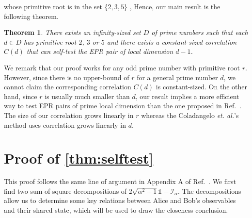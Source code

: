 \documentclass[11pt,letterpaper]{article}
\newcommand{\1}{\mathbb{1}}
\newcommand{\I}{\mathcal{I}}
\newtheorem{theorem}{Theorem}
\theoremstyle{definition}
\begin{document}
whose primitive root is in the set $\{2,3,5\}$ \cite{murty1988},
Hence, our main result is the following theorem.
\begin{theorem}
	There exists an infinity-sized set $D$ of prime numbers such that 
	each $d \in D$ has primitive root $2$, $3$ or $5$ and there exists
	a constant-sized correlation $C(d)$ that can self-test the EPR pair of 
	local dimension $d-1$.
\end{theorem}
We remark that our proof works for any odd prime number with primitive root $r$.
However, since there is no upper-bound of $r$ for a general prime number $d$, we 
cannot claim the corresponding correlation $C(d)$ is constant-sized. On the other
hand, since $r$ is usually much smaller than $d$, our result implies a more efficient
way to test EPR pairs of prime local dimension than the one proposed in Ref.~\cite{cgs2017}.
The size of our correlation grows linearly in $r$ whereas the Coladangelo \textit{et. al.}'s
method uses correlation grows linearly in $d$.



\appendix
\section{Proof of \cref{thm:selftest} }
\label{sec:selftest}
This proof follows the same line of argument in Appendix A of Ref.~\cite{bamps2015}.
We first find two sum-of-square decompositions of $2\sqrt{\alpha^2+1} \1 - \I_\alpha$.
The decompositions allow us to determine some key relations between Alice and Bob's observables
and their shared state, which will be used to draw the closeness conclusion.
\end{document}
